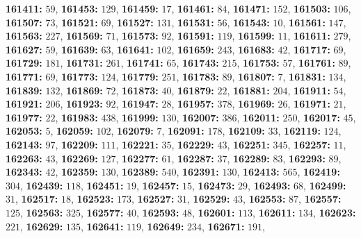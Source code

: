 \textsf{\bfseries 161411:} $59$, \textsf{\bfseries 161453:} $129$, \textsf{\bfseries 161459:} $17$, \textsf{\bfseries 161461:} $84$, \textsf{\bfseries 161471:} $152$, \textsf{\bfseries 161503:} $106$, \textsf{\bfseries 161507:} $73$, \textsf{\bfseries 161521:} $69$, \textsf{\bfseries 161527:} $131$, \textsf{\bfseries 161531:} $56$, \textsf{\bfseries 161543:} $10$, \textsf{\bfseries 161561:} $147$, \textsf{\bfseries 161563:} $227$, \textsf{\bfseries 161569:} $71$, \textsf{\bfseries 161573:} $92$, \textsf{\bfseries 161591:} $119$, \textsf{\bfseries 161599:} $11$, \textsf{\bfseries 161611:} $279$, \textsf{\bfseries 161627:} $59$, \textsf{\bfseries 161639:} $63$, \textsf{\bfseries 161641:} $102$, \textsf{\bfseries 161659:} $243$, \textsf{\bfseries 161683:} $42$, \textsf{\bfseries 161717:} $69$, \textsf{\bfseries 161729:} $181$, \textsf{\bfseries 161731:} $261$, \textsf{\bfseries 161741:} $65$, \textsf{\bfseries 161743:} $215$, \textsf{\bfseries 161753:} $57$, \textsf{\bfseries 161761:} $89$, \textsf{\bfseries 161771:} $69$, \textsf{\bfseries 161773:} $124$, \textsf{\bfseries 161779:} $251$, \textsf{\bfseries 161783:} $89$, \textsf{\bfseries 161807:} $7$, \textsf{\bfseries 161831:} $134$, \textsf{\bfseries 161839:} $132$, \textsf{\bfseries 161869:} $72$, \textsf{\bfseries 161873:} $40$, \textsf{\bfseries 161879:} $22$, \textsf{\bfseries 161881:} $204$, \textsf{\bfseries 161911:} $54$, \textsf{\bfseries 161921:} $206$, \textsf{\bfseries 161923:} $92$, \textsf{\bfseries 161947:} $28$, \textsf{\bfseries 161957:} $378$, \textsf{\bfseries 161969:} $26$, \textsf{\bfseries 161971:} $21$, \textsf{\bfseries 161977:} $22$, \textsf{\bfseries 161983:} $438$, \textsf{\bfseries 161999:} $130$, \textsf{\bfseries 162007:} $386$, \textsf{\bfseries 162011:} $250$, \textsf{\bfseries 162017:} $45$, \textsf{\bfseries 162053:} $5$, \textsf{\bfseries 162059:} $102$, \textsf{\bfseries 162079:} $7$, \textsf{\bfseries 162091:} $178$, \textsf{\bfseries 162109:} $33$, \textsf{\bfseries 162119:} $124$, \textsf{\bfseries 162143:} $97$, \textsf{\bfseries 162209:} $111$, \textsf{\bfseries 162221:} $35$, \textsf{\bfseries 162229:} $43$, \textsf{\bfseries 162251:} $345$, \textsf{\bfseries 162257:} $11$, \textsf{\bfseries 162263:} $43$, \textsf{\bfseries 162269:} $127$, \textsf{\bfseries 162277:} $61$, \textsf{\bfseries 162287:} $37$, \textsf{\bfseries 162289:} $83$, \textsf{\bfseries 162293:} $89$, \textsf{\bfseries 162343:} $42$, \textsf{\bfseries 162359:} $130$, \textsf{\bfseries 162389:} $540$, \textsf{\bfseries 162391:} $130$, \textsf{\bfseries 162413:} $565$, \textsf{\bfseries 162419:} $304$, \textsf{\bfseries 162439:} $118$, \textsf{\bfseries 162451:} $19$, \textsf{\bfseries 162457:} $15$, \textsf{\bfseries 162473:} $29$, \textsf{\bfseries 162493:} $68$, \textsf{\bfseries 162499:} $31$, \textsf{\bfseries 162517:} $18$, \textsf{\bfseries 162523:} $173$, \textsf{\bfseries 162527:} $31$, \textsf{\bfseries 162529:} $43$, \textsf{\bfseries 162553:} $87$, \textsf{\bfseries 162557:} $125$, \textsf{\bfseries 162563:} $325$, \textsf{\bfseries 162577:} $40$, \textsf{\bfseries 162593:} $48$, \textsf{\bfseries 162601:} $113$, \textsf{\bfseries 162611:} $134$, \textsf{\bfseries 162623:} $221$, \textsf{\bfseries 162629:} $135$, \textsf{\bfseries 162641:} $119$, \textsf{\bfseries 162649:} $234$, \textsf{\bfseries 162671:} $191$, 
